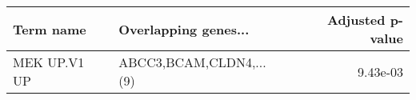 \begin{tabular}{llr}
\toprule
   Term name &    Overlapping genes... &  Adjusted p-value \\
\midrule
MEK UP.V1 UP & ABCC3,BCAM,CLDN4,...(9) &          9.43e-03 \\
\bottomrule
\end{tabular}
